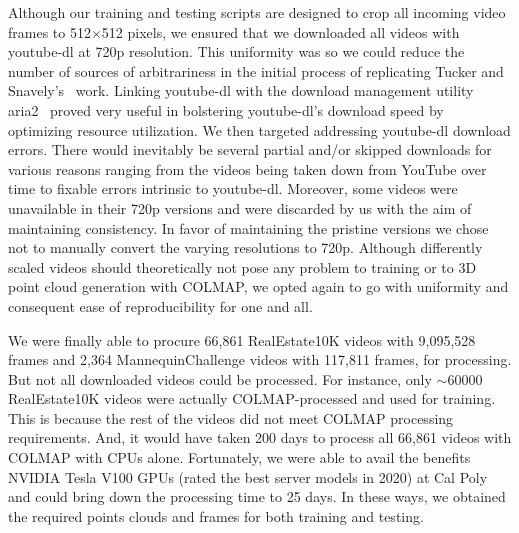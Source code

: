 Although our training and testing scripts are designed to crop all incoming video frames to 512$\times$512 pixels, we ensured that we downloaded all videos with youtube-dl at 720p resolution. This uniformity was so we could reduce the number of sources of arbitrariness in the initial process of replicating Tucker and Snavely's~\cite{single_view_mpi} work. Linking youtube-dl with the download management utility aria2~\cite{noauthor_aria2_2021} proved very useful in bolstering youtube-dl’s download speed by optimizing resource utilization. We then targeted addressing youtube-dl download errors. There would inevitably be several partial and/or skipped downloads for various reasons ranging from the videos being taken down from YouTube over time to fixable errors intrinsic to youtube-dl. Moreover, some videos were unavailable in their 720p versions and were discarded by us with the aim of maintaining consistency. In favor of maintaining the pristine versions we chose not to manually convert the varying resolutions to 720p. Although differently scaled videos should theoretically not pose any problem to training or to 3D point cloud generation with COLMAP, we opted again to go with uniformity and consequent ease of reproducibility for one and all.
    
We were finally able to procure 66,861 RealEstate10K videos with 9,095,528 frames and 2,364 MannequinChallenge videos with 117,811 frames, for processing. But not all downloaded videos could be processed. For instance, only $\sim$60000 RealEstate10K videos were actually COLMAP-processed and used for training. This is because the rest of the videos did not meet COLMAP processing requirements. And, it would have taken 200 days to process all 66,861 videos with COLMAP with CPUs alone. Fortunately, we were able to avail the benefits NVIDIA Tesla V100 GPUs (rated the best server models in 2020) at Cal Poly and could bring down the processing time to 25 days. In these ways, we obtained the required points clouds and frames for both training and testing.















